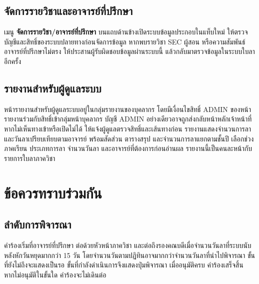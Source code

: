 \documentclass[17pt,a4paper]{extreport}
\begin{document}
\section{จัดการรายวิชาและอาจารย์ที่ปรึกษา}
เมนู \textbf{จัดการรายวิชา/อาจารย์ที่ปรึกษา} บนแถบด้านข้างเปิดระบบข้อมูลประกอบในแท็บใหม่ ให้ตรวจบัญชีและสิทธิ์ของระบบปลายทางก่อนจัดการข้อมูล หากพบรายวิชา SEC ผู้สอน หรือความสัมพันธ์อาจารย์ที่ปรึกษาไม่ตรง ให้ประสานผู้รับผิดชอบข้อมูลผ่านระบบนี้ แล้วกลับมาตรวจข้อมูลในระบบใบลาอีกครั้ง

\section{รายงานสำหรับผู้ดูแลระบบ}
หน้ารายงานสำหรับผู้ดูแลระบบอยู่ในกลุ่มรายงานของบุคลากร โดยมีเงื่อนไขสิทธิ์ ADMIN ของหน้ารายงานร่วมกับสิทธิ์เข้ากลุ่มหน้าบุคลากร บัญชี ADMIN อย่างเดียวอาจถูกส่งกลับหน้าหลักเจ้าหน้าที่ หากไม่เห็นทางเข้าหรือเปิดไม่ได้ ให้แจ้งผู้ดูแลตรวจสิทธิ์และเส้นทางก่อน รายงานแสดงจำนวนการลาและวันลาเปรียบเทียบตามอาจารย์ พร้อมสัดส่วน ตารางสรุป และจำนวนการลาแยกตามชั้นปี เลือกช่วงภาคเรียน ประเภทการลา จำนวนวันลา และอาจารย์ที่ต้องการก่อนอ่านผล รายงานนี้เป็นคนละหน้ากับรายการใบลาภาควิชา

\chapter{ข้อควรทราบร่วมกัน}
\section{ลำดับการพิจารณา}
คำร้องเริ่มที่อาจารย์ที่ปรึกษา ต่อด้วยหัวหน้าภาควิชา และต่อถึงรองคณบดีเมื่อจำนวนวันลาที่ระบบนับหลังหักวันหยุดมากกว่า 15 วัน โดยจำนวนวันตามปฏิทินอาจมากกว่าจำนวนวันลาที่นำไปพิจารณา ขั้นที่ยังไม่ถึงจะแสดงเป็นรอ ขั้นที่กำลังดำเนินการจึงแสดงปุ่มพิจารณา เมื่ออนุมัติครบ คำร้องเสร็จสิ้น หากไม่อนุมัติในขั้นใด คำร้องจะไม่เดินต่อ
\end{document}
